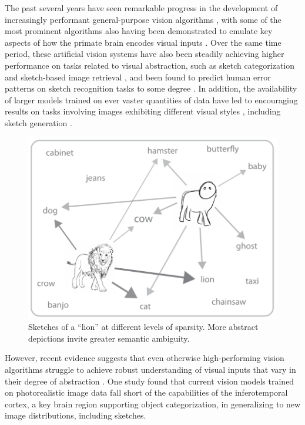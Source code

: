 \documentclass{article}
\begin{document}

The past several years have seen remarkable progress in the development of increasingly performant general-purpose vision algorithms \cite{simonyan2014very, he2016deep, dosovitskiy2020image, radford2021learning}, with some of the most prominent algorithms also having been demonstrated to emulate key aspects of how the primate brain encodes visual inputs \cite{yamins2014performance, kriegeskorte2015deep, zhuang2021unsupervised, konkle2022self}. 
Over the same time period, these artificial vision systems have also been steadily achieving higher performance on tasks related to visual abstraction, such as sketch categorization and sketch-based image retrieval \cite{eitz2012sketch,sangkloy2016sketchy, yu2016sketch, yu2017sketch, bhunia2020sketch, xu2022deep}, and been found to predict human error patterns on sketch recognition tasks to some degree \cite{fan2018common}. 
In addition, the availability of larger models trained on ever vaster quantities of data have led to encouraging results on tasks involving images exhibiting different visual styles \cite{radford2021learning}, including sketch generation \cite{vinker2022clipasso,qiu2022emergent}.
\begin{figure}
\centering
\includegraphics[width=.4\textwidth]{neurips_figures/neurips_sketch_polysemy.pdf}
    \caption{Sketches of a ``lion'' at different levels of sparsity. More abstract depictions invite greater semantic ambiguity.}
    \label{fig:polysemy}
\end{figure}
However, recent evidence suggests that even otherwise high-performing vision algorithms struggle to achieve robust understanding of visual inputs that vary in their degree of abstraction \cite{baker2018abstract, singer2022photos, fan2020pragmatic}. 
One study found that current vision models trained on photorealistic image data fall short of the capabilities of the inferotemporal cortex, a key brain region supporting object categorization, in generalizing to new image distributions, including sketches.
\end{document}
